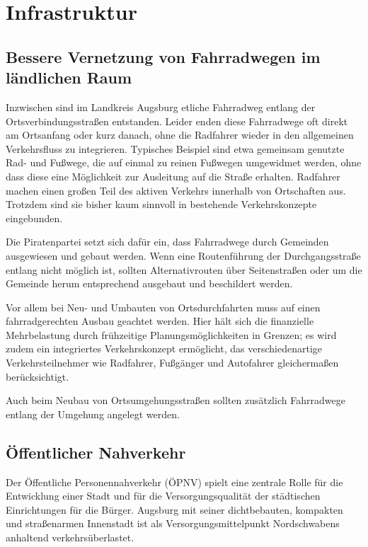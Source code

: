 \chapter{Infrastruktur}

  \section{Bessere Vernetzung von Fahrradwegen im ländlichen Raum}
  
  Inzwischen sind im Landkreis Augsburg etliche Fahrradweg entlang der 
  Ortsverbindungsstraßen entstanden. Leider enden diese Fahrradwege oft direkt 
  am Ortsanfang oder kurz danach, ohne die Radfahrer wieder in den allgemeinen 
  Verkehrsfluss zu integrieren. Typisches Beispiel sind etwa gemeinsam 
  genutzte Rad- und Fußwege, die auf einmal zu reinen Fußwegen umgewidmet 
  werden, ohne dass diese eine Möglichkeit zur Ausleitung auf die Straße 
  erhalten. Radfahrer machen einen großen Teil des aktiven Verkehrs innerhalb 
  von Ortschaften aus. Trotzdem sind sie bisher kaum sinnvoll in bestehende 
  Verkehrskonzepte eingebunden.
  
  Die Piratenpartei setzt sich dafür ein, dass Fahrradwege durch Gemeinden 
  ausgewiesen und gebaut werden. Wenn eine Routenführung der Durchgangsstraße 
  entlang nicht möglich ist, sollten Alternativrouten über Seitenstraßen oder 
  um die Gemeinde herum entsprechend ausgebaut und beschildert werden.
  
  Vor allem bei Neu- und Umbauten von Ortsdurchfahrten muss auf einen 
  fahrradgerechten Ausbau geachtet werden. Hier hält sich die finanzielle 
  Mehrbelastung durch frühzeitige Planungsmöglichkeiten in Grenzen; es wird 
  zudem ein integriertes Verkehrskonzept ermöglicht, das verschiedenartige 
  Verkehrsteilnehmer wie Radfahrer, Fußgänger und Autofahrer gleichermaßen 
  berücksichtigt.
  
  Auch beim Neubau von Ortsumgehungsstraßen sollten zusätzlich Fahrradwege 
  entlang der Umgehung angelegt werden.
  
  \section{Öffentlicher Nahverkehr}
  
  Der Öffentliche Personennahverkehr (ÖPNV) spielt eine zentrale Rolle für die 
  Entwicklung einer Stadt und für die Versorgungsqualität der städtischen 
  Einrichtungen für die Bürger. Augsburg mit seiner dichtbebauten, kompakten 
  und straßenarmen Innenstadt ist als Versorgungsmittelpunkt Nordschwabens 
  anhaltend verkehrsüberlastet.
  
